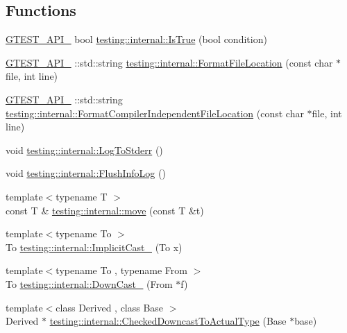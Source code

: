 \subsection*{Functions}
\begin{DoxyCompactItemize}
\item 
\mbox{\hyperlink{gtest-port_8h_aa73be6f0ba4a7456180a94904ce17790}{G\+T\+E\+S\+T\+\_\+\+A\+P\+I\+\_\+}} bool \mbox{\hyperlink{namespacetesting_1_1internal_ab2709373c78eb8b1c22a6ba30cceba52}{testing\+::internal\+::\+Is\+True}} (bool condition)
\item 
\mbox{\hyperlink{gtest-port_8h_aa73be6f0ba4a7456180a94904ce17790}{G\+T\+E\+S\+T\+\_\+\+A\+P\+I\+\_\+}} \+::std\+::string \mbox{\hyperlink{namespacetesting_1_1internal_aea0ca448425df26e868a7d9447b9b7a1}{testing\+::internal\+::\+Format\+File\+Location}} (const char $\ast$file, int line)
\item 
\mbox{\hyperlink{gtest-port_8h_aa73be6f0ba4a7456180a94904ce17790}{G\+T\+E\+S\+T\+\_\+\+A\+P\+I\+\_\+}} \+::std\+::string \mbox{\hyperlink{namespacetesting_1_1internal_a882004bab0e3f0d1e9c913ae4e7fae50}{testing\+::internal\+::\+Format\+Compiler\+Independent\+File\+Location}} (const char $\ast$file, int line)
\item 
void \mbox{\hyperlink{namespacetesting_1_1internal_a06b1b20029fbd1dbeb59752f914fab84}{testing\+::internal\+::\+Log\+To\+Stderr}} ()
\item 
void \mbox{\hyperlink{namespacetesting_1_1internal_a2135f223bf6b527729aeaa651115183b}{testing\+::internal\+::\+Flush\+Info\+Log}} ()
\item 
{\footnotesize template$<$typename T $>$ }\\const T \& \mbox{\hyperlink{namespacetesting_1_1internal_a0f6d06bf8c3093b9c22bb08723db201e}{testing\+::internal\+::move}} (const T \&t)
\item 
{\footnotesize template$<$typename To $>$ }\\To \mbox{\hyperlink{namespacetesting_1_1internal_a982df3f369643b175f79cda4048bc3b9}{testing\+::internal\+::\+Implicit\+Cast\+\_\+}} (To x)
\item 
{\footnotesize template$<$typename To , typename From $>$ }\\To \mbox{\hyperlink{namespacetesting_1_1internal_a1a1a1aed3fe00908b8a45d5ab4a33665}{testing\+::internal\+::\+Down\+Cast\+\_\+}} (From $\ast$f)
\item 
{\footnotesize template$<$class Derived , class Base $>$ }\\Derived $\ast$ \mbox{\hyperlink{namespacetesting_1_1internal_abfe9bfb020d38aa4e0e12c001911b22b}{testing\+::internal\+::\+Checked\+Downcast\+To\+Actual\+Type}} (Base $\ast$base)

\end{DoxyCompactItemize}
